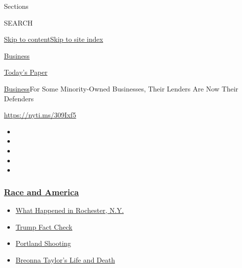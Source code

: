 Sections

SEARCH

\protect\hyperlink{site-content}{Skip to
content}\protect\hyperlink{site-index}{Skip to site index}

\href{https://www.nytimes3xbfgragh.onion/section/business}{Business}

\href{https://myaccount.nytimes3xbfgragh.onion/auth/login?response_type=cookie\&client_id=vi}{}

\href{https://www.nytimes3xbfgragh.onion/section/todayspaper}{Today's
Paper}

\href{/section/business}{Business}\textbar{}For Some Minority-Owned
Businesses, Their Lenders Are Now Their Defenders

\url{https://nyti.ms/309Ixf5}

\begin{itemize}
\item
\item
\item
\item
\item
\end{itemize}

\hypertarget{race-and-america}{%
\subsubsection{\texorpdfstring{\href{https://www.nytimes3xbfgragh.onion/news-event/george-floyd-protests-minneapolis-new-york-los-angeles?name=styln-george-floyd\&region=TOP_BANNER\&block=storyline_menu_recirc\&action=click\&pgtype=Article\&impression_id=53f8e600-f28e-11ea-906f-39f9ccaeecdc\&variant=undefined}{Race
and America}}{Race and America}}\label{race-and-america}}

\begin{itemize}
\tightlist
\item
  \href{https://www.nytimes3xbfgragh.onion/2020/09/04/nyregion/rochester-police-daniel-prude.html?name=styln-george-floyd\&region=TOP_BANNER\&block=storyline_menu_recirc\&action=click\&pgtype=Article\&impression_id=53f8e601-f28e-11ea-906f-39f9ccaeecdc\&variant=undefined}{What
  Happened in Rochester, N.Y.}
\item
  \href{https://www.nytimes3xbfgragh.onion/2020/09/01/us/politics/trump-fact-check-protests.html?name=styln-george-floyd\&region=TOP_BANNER\&block=storyline_menu_recirc\&action=click\&pgtype=Article\&impression_id=53f8e602-f28e-11ea-906f-39f9ccaeecdc\&variant=undefined}{Trump
  Fact Check}
\item
  \href{https://www.nytimes3xbfgragh.onion/2020/08/30/us/portland-shooting-explained.html?name=styln-george-floyd\&region=TOP_BANNER\&block=storyline_menu_recirc\&action=click\&pgtype=Article\&impression_id=53f90d10-f28e-11ea-906f-39f9ccaeecdc\&variant=undefined}{Portland
  Shooting}
\item
  \href{https://www.nytimes3xbfgragh.onion/2020/08/30/us/breonna-taylor-police-killing.html?name=styln-george-floyd\&region=TOP_BANNER\&block=storyline_menu_recirc\&action=click\&pgtype=Article\&impression_id=53f90d11-f28e-11ea-906f-39f9ccaeecdc\&variant=undefined}{Breonna
  Taylor's Life and Death}
\end{itemize}

